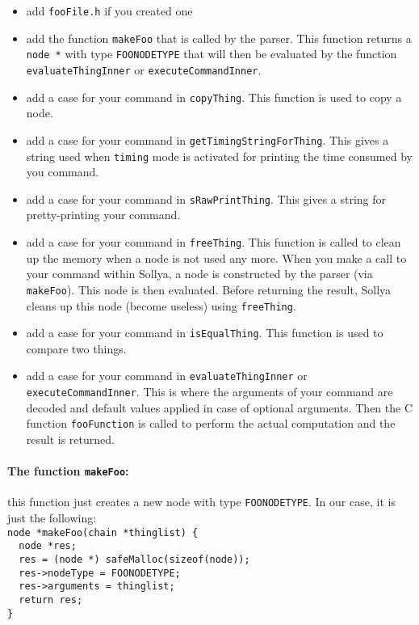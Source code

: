 \documentclass{article}
\newcommand{\commandFunction}{\texttt{fooFunction}\xspace}
\newcommand{\commandFile}[1]{\texttt{fooFile#1}\xspace}
\newcommand{\commandMakeFunc}{\texttt{makeFoo}}
\newcommand{\commandNodeName}{\texttt{FOONODETYPE}\xspace}
\begin{document}
\begin{itemize}
\item add \commandFile{.h} if you created one
\item add the function \commandMakeFunc{} that is called by the parser. This function returns a \texttt{node *} with type \commandNodeName that will then be evaluated by the function \texttt{evaluateThingInner} or \texttt{executeCommandInner}.
\item add a case for your command in \texttt{copyThing}. This function is used to copy a node.
\item add a case for your command in \texttt{getTimingStringForThing}. This gives a string used when \texttt{timing} mode is activated for printing the time consumed by you command.
\item add a case for your command in \texttt{sRawPrintThing}. This gives a string for pretty-printing your command.
\item add a case for your command in \texttt{freeThing}. This function is called to clean up the memory when a node is not used any more. When you make a call to your command within Sollya, a node is constructed by the parser (via \commandMakeFunc). This node is then evaluated. Before returning the result, Sollya cleans up this node (become useless) using \texttt{freeThing}.
\item add a case for your command in \texttt{isEqualThing}. This function is used to compare two things.
\item add a case for your command in \texttt{evaluateThingInner} or \texttt{executeCommandInner}. This is where the arguments of your command are decoded and default values applied in case of optional arguments. Then the C function \commandFunction is called to perform the actual computation and the result is returned. 
\end{itemize}

\paragraph{The function  \commandMakeFunc: } this function just creates a new node with type \commandNodeName. In our case, it is just the following:\\
\texttt{node *}\commandMakeFunc\texttt{(chain *thinglist) \{}\\
\phantom{1}\texttt{~~node *res;}\\
\phantom{1}\texttt{~~res = (node *) safeMalloc(sizeof(node));}\\
\phantom{1}\texttt{~~res->nodeType = }\commandNodeName\texttt{;}\\
\phantom{1}\texttt{~~res->arguments = thinglist;}\\
\phantom{1}\texttt{~~return res;}\\
\texttt{\}}
\end{document}
